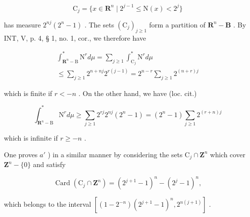 \[
\mathrm{C} _ {j} = \{x \in \mathbf {R} ^ {n} \mid 2 ^ {j - 1} \leqslant \mathrm{N} (x) <   2 ^ {j} \}
\]

has measure \(2^{nj}(2^n - 1)\) . The sets \((\mathrm{C}_j)_{j \geqslant 1}\) form a partition of \(\mathbf{R}^n - \mathbf{B}\) . By INT, V, p. 4, § 1, no. 1, cor., we therefore have

\[
\begin{array}{c} \int_ {\mathbf {R} ^ {n} - \mathrm{B}} ^ {*} \mathrm{N} ^ {r} d \mu = \sum_ {j \geqslant 1} \int_ {\mathrm{C} _ {j}} ^ {*} \mathrm{N} ^ {r} d \mu \\ \leqslant \sum_ {j \geqslant 1} 2 ^ {n + n j} 2 ^ {r (j - 1)} = 2 ^ {n - r} \sum_ {j \geqslant 1} 2 ^ {(n + r) j} \end{array}
\]

which is finite if \(r < -n\) . On the other hand, we have (loc. cit.)

\[
\int_ {\mathbf {R} ^ {n} - \mathrm{B}} ^ {*} \mathrm{N} ^ {r} d \mu \geqslant \sum_ {j \geqslant 1} 2 ^ {r j} 2 ^ {n j} (2 ^ {n} - 1) = (2 ^ {n} - 1) \sum_ {j \geqslant 1} 2 ^ {(r + n) j}
\]

which is infinite if \(r \geqslant -n\) .

One proves \(a'\) ) in a similar manner by considering the sets \(\mathrm{C}_{j} \cap \mathbf{Z}^{n}\) which cover \(\mathbf{Z}^{n} - \{0\}\) and satisfy

\[
\operatorname{Card} \left(\mathrm{C} _ {j} \cap \mathbf {Z} ^ {n}\right) = (2 ^ {j + 1} - 1) ^ {n} - (2 ^ {j} - 1) ^ {n},
\]

which belongs to the interval \([(1-2^{-n})(2^{j+1}-1)^{n},2^{n(j+1)}]\) .

